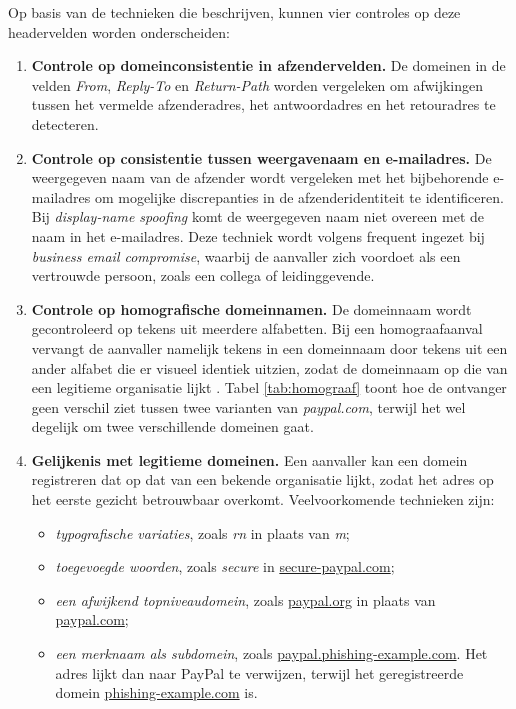 Op basis van de technieken die \textcite{Veit2025} beschrijven, kunnen vier controles op deze headervelden worden onderscheiden:
\begin{enumerate}
    \item \textbf{Controle op domeinconsistentie in afzendervelden.} De domeinen in de velden \emph{From}, \emph{Reply-To} en \emph{Return-Path} worden vergeleken om afwijkingen tussen het vermelde afzenderadres, het antwoordadres en het retouradres te detecteren.
    \item \textbf{Controle op consistentie tussen weergavenaam en e-mailadres.} De weergegeven naam van de afzender wordt vergeleken met het bijbehorende e-mailadres om mogelijke discrepanties in de afzenderidentiteit te identificeren. Bij \emph{display-name spoofing} komt de weergegeven naam niet overeen met de naam in het e-mailadres. Deze techniek wordt volgens \textcite{Cidon2019} frequent ingezet bij \emph{business email compromise}, waarbij de aanvaller zich voordoet als een vertrouwde persoon, zoals een collega of leidinggevende.
    \item \textbf{Controle op homografische domeinnamen.} De domeinnaam wordt gecontroleerd op tekens uit meerdere alfabetten. Bij een homograafaanval vervangt de aanvaller namelijk tekens in een domeinnaam door tekens uit een ander alfabet die er visueel identiek uitzien, zodat de domeinnaam op die van een legitieme organisatie lijkt \autocite{Sawabe2019}. Tabel \ref{tab:homograaf} toont hoe de ontvanger geen verschil ziet tussen twee varianten van \emph{paypal.com}, terwijl het wel degelijk om twee verschillende domeinen gaat.
    \item \textbf{Gelijkenis met legitieme domeinen.} Een aanvaller kan een domein registreren dat op dat van een bekende organisatie lijkt, zodat het adres op het eerste gezicht betrouwbaar overkomt. Veelvoorkomende technieken zijn:
        \begin{itemize}
        \item \emph{typografische variaties}, zoals \emph{rn} in plaats van \emph{m};
        \item \emph{toegevoegde woorden}, zoals \emph{secure} in \url{secure-paypal.com};
        \item \emph{een afwijkend topniveaudomein}, zoals \url{paypal.org} in plaats van \url{paypal.com};
        \item \emph{een merknaam als subdomein}, zoals \url{paypal.phishing-example.com}. Het adres lijkt dan naar PayPal te verwijzen, terwijl het geregistreerde domein \url{phishing-example.com} is.
        \end{itemize}
\end{enumerate}

